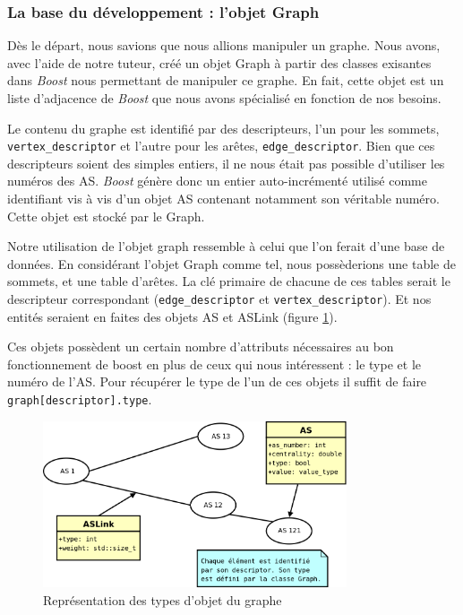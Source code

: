 \subsubsection{La base du développement : l'objet Graph}

Dès le départ, nous savions que nous allions manipuler un graphe. Nous avons, avec l'aide de notre tuteur, créé un objet Graph à partir des classes exisantes dans \textit{Boost} nous permettant de manipuler ce graphe. En fait, cette objet est un liste d'adjacence de \textit{Boost} que nous avons spécialisé en fonction de nos besoins.

Le contenu du graphe est identifié par des descripteurs, l'un pour les sommets, \verb|vertex_descriptor| et l'autre pour les arêtes, \verb|edge_descriptor|. Bien que ces descripteurs soient des simples entiers, il ne nous était pas possible d'utiliser les numéros des AS. \textit{Boost} génère donc un entier auto-incrémenté utilisé comme identifiant vis à vis d'un objet AS contenant notamment son véritable numéro. Cette objet est stocké par le Graph.

Notre utilisation de l'objet graph ressemble à celui que l'on ferait d'une base de données. En considérant l'objet Graph comme tel, nous possèderions une table de sommets, et une table d'arêtes. La clé primaire de chacune de ces tables serait le descripteur correspondant (\verb|edge_descriptor| et \verb|vertex_descriptor|). Et nos entités seraient en faites des objets AS et ASLink (figure \ref{bdd}).

Ces objets possèdent un certain nombre d'attributs nécessaires au bon fonctionnement de boost en plus de ceux qui nous intéressent : le type et le numéro de l'AS. Pour récupérer le type de l'un de ces objets il suffit de faire \verb|graph[descriptor].type|.


\begin{figure}[H]
\begin{center}
        \includegraphics[width=0.8\textwidth]{./schema/bdd.png}
\caption{Représentation des types d'objet du graphe}
\label{bdd}
\end{center}
\end{figure}

